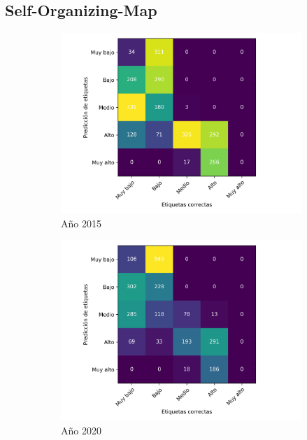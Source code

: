 \subsection{Self-Organizing-Map}

\begin{figure}[H]
    \centering
    \begin{subfigure}{8.4cm}
        \includegraphics[width=1\linewidth]{Graphics/Data_2015/SOM_confusion_matrix.png}
        \caption{Año 2015}
    \end{subfigure}
    \begin{subfigure}{8.4cm}
        \includegraphics[width=1\linewidth]{Graphics/Data_2020/SOM_confusion_matrix.png}
        \caption{Año 2020}
    \end{subfigure}
    \caption{}
\end{figure}